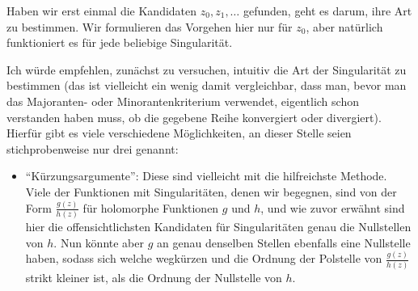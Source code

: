 \documentclass{article}
\theoremstyle{plain}
\theoremstyle{definition}
\begin{document}
Haben wir erst einmal die Kandidaten $z_0, z_1, \dots$ gefunden, geht es darum, ihre Art zu bestimmen.
Wir formulieren das Vorgehen hier nur für $z_0$, aber natürlich funktioniert es für jede beliebige Singularität.

Ich würde empfehlen, zunächst zu versuchen, intuitiv die Art der Singularität zu bestimmen (das ist vielleicht ein wenig damit vergleichbar, dass man, bevor man das Majoranten- oder Minorantenkriterium verwendet, eigentlich schon verstanden haben muss, ob die gegebene Reihe konvergiert oder divergiert).
Hierfür gibt es viele verschiedene Möglichkeiten, an dieser Stelle seien stichprobenweise nur drei genannt:
\begin{itemize}
	\item \enquote{Kürzungsargumente}: Diese sind vielleicht mit die hilfreichste Methode.
	      Viele der Funktionen mit Singularitäten, denen wir begegnen, sind von der Form $\frac{g(z)}{h(z)}$ für holomorphe Funktionen $g$ und $h$, und wie zuvor erwähnt sind hier die offensichtlichsten Kandidaten für Singularitäten genau die Nullstellen von $h$.
	      Nun könnte aber $g$ an genau denselben Stellen ebenfalls eine Nullstelle haben, sodass sich welche wegkürzen und die Ordnung der Polstelle von $\frac{g(z)}{h(z)}$ strikt kleiner ist, als die Ordnung der Nullstelle von $h$.


\end{itemize}
\end{document}
